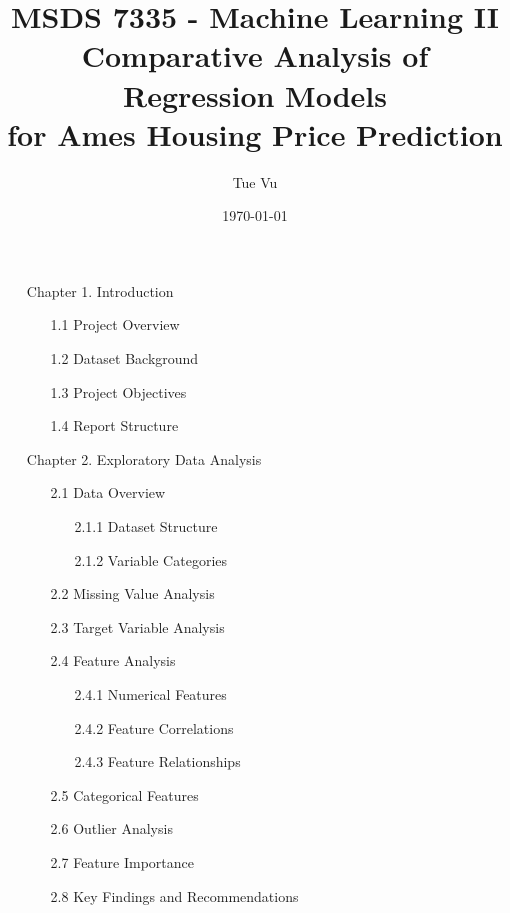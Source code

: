 \documentclass[12pt]{report}
\title{
    {\Large MSDS 7335 - Machine Learning II}\\[0.5cm]
    {\huge Comparative Analysis of Regression Models\\for Ames Housing Price Prediction}\\[0.5cm]
}
\author{Tue Vu}
\date{\today}
\begin{document}
\maketitle

\cleardoublepage
\tableofcontents

\begin{itemize}
\item[Chapter 1.] Introduction
    \begin{itemize}
    \item[1.1] Project Overview
    \item[1.2] Dataset Background
    \item[1.3] Project Objectives
    \item[1.4] Report Structure
    \end{itemize}

\item[Chapter 2.] Exploratory Data Analysis
    \begin{itemize}
    \item[2.1] Data Overview
        \begin{itemize}
        \item[2.1.1] Dataset Structure
        \item[2.1.2] Variable Categories
        \end{itemize}
    \item[2.2] Missing Value Analysis
    \item[2.3] Target Variable Analysis
    \item[2.4] Feature Analysis
        \begin{itemize}
        \item[2.4.1] Numerical Features
        \item[2.4.2] Feature Correlations
        \item[2.4.3] Feature Relationships
        \end{itemize}
    \item[2.5] Categorical Features
    \item[2.6] Outlier Analysis
    \item[2.7] Feature Importance
    \item[2.8] Key Findings and Recommendations
    \end{itemize}


\end{itemize}
\end{document}
